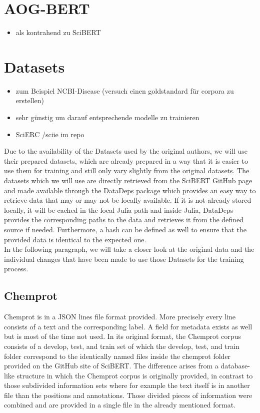 \color{ForestGreen}
\section{AOG-BERT}
\begin{itemize}
	\item als kontrahend zu SciBERT \cite{Liu2021}
\end{itemize}
\section{Datasets}
\begin{itemize}
	\item zum Beispiel NCBI-Disease (versuch einen goldstandard für corpora zu erstellen)
	\item sehr günstig um darauf entsprechende modelle zu trainieren \cite{Dogan2014}
	\item SciERC /sciie im repo \cite{luan2018multitask}
\end{itemize}
\color{black}
Due to the availability of the Datasets used by the original authors, we will use their prepared datasets, which are already prepared in a way that it is easier to use them for training and still only vary slightly from the original datasets. The datasets which we will use are directly retrieved from the SciBERT GitHub page and made available through the DataDeps package which provides an easy way to retrieve data that may or may not be locally available. If it is not already stored locally, it will be cached in the local Julia path and inside Julia, DataDeps provides the corresponding paths to the data and retrieves it from the defined source if needed. Furthermore, a hash can be defined as well to ensure that the provided data is identical to the expected one.\cite{White2019}\\
In the following paragraph, we will take a closer look at the original data and the individual changes that have been made to use those Datasets for the training process.
\subsection{Chemprot}
Chemprot is in a JSON lines file format provided. More precisely every line consists of a text and the corresponding label. A field for metadata exists as well but is most of the time not used. In its original format, the Chemprot corpus consists of a develop, test, and train set of which the develop, test, and train folder correspond to the identically named files inside the chemprot folder provided on the GitHub site of SciBERT. The difference arises from a database-like structure in which the Chemprot corpus is originally provided, in contrast to those subdivided information sets where for example the text itself is in another file than the positions and annotations. Those divided pieces of information were combined and are provided in a single file in the already mentioned format. \cite{Beltagy2019,Wang2016}